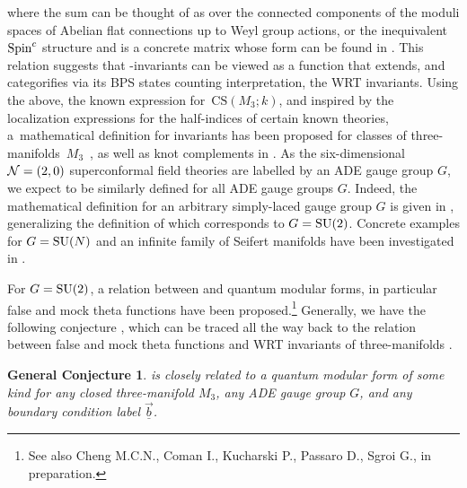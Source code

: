\documentclass[pdftex]{sigma}
\newcommand{\Zhshort}[3]{\ensuremath{\widehat{Z}^{#1}_{#2}\left(#3\right)}}
\def\bv{{\vec{\underline{b}}}}
\newtheorem*{conj*}{General Conjecture}
\theoremstyle{definition}
\numberwithin{equation}{section}
\begin{document}
where the sum can be thought of as over the connected components of the moduli spaces of Abelian flat connections up to Weyl group actions, or the inequivalent ${\rm Spin}^c$ structure and  is a concrete matrix whose form can be found in \cite{cheng20193d,gukov2019two,Gukov:2017kmk}. This relation suggests that -invariants can be viewed as a function that extends, and categorifies via its BPS states counting interpretation, the WRT invariants. Using the above, the known expression for~$\mathrm{CS}(M_3;k)$, and inspired by the localization expressions for the half-indices of certain known theories, a~mathematical definition for \smash{$\Zhshort{G}{\bv}{M_3}$} invariants has been proposed for classes of three-manifolds~$M_3$~\cite{Gukov:2017kmk}, as well as knot complements in \cite{gukov2019two}. As the six-dimensional ${\cal N}=(2,0)$ superconformal field theories are labelled by an ADE gauge group $G$, we expect \smash{$\widehat Z^G_\bv(M_3)$} to be similarly defined for all ADE gauge groups $G$. Indeed, the mathematical definition for an arbitrary simply-laced gauge group $G$ is given in \cite{Park:2019xey}, generalizing the definition of \cite{Gukov:2017kmk} which corresponds to $G={\rm SU}(2)$. Concrete examples for $G={\rm SU}(N)$ and an infinite family of Seifert manifolds have been investigated in \cite{Chung:2018rea}.

For $G={\rm SU}(2)$, a relation between \smash{$\Zhshort{{\rm SU}(2)}{\bv}{M_3}$} and quantum modular forms, in particular false \cite{Bringmann_2020,bringmann2019quantum,cheng20193d} and mock theta functions \cite{cheng20193d, Cheng:2019uzc, Park:2021ufu} %
have been proposed.\footnote{See also Cheng M.C.N., Coman I., Kucharski P., Passaro D., Sgroi G., in preparation.} Generally, we have the following conjecture \cite{cheng20193d}, which can be traced all the way back to the relation between false and mock theta functions and WRT invariants of three-manifolds \cite{2005RCD10509H, HIKAMI_2005, 2004mathph9016H,lawrence1999modular}.
\begin{conj*}
\smash{$\widehat Z^G_\bv(M_3)$} is closely related to a quantum modular form of some kind for any closed three-manifold $M_3$, any ADE gauge group $G$, and any boundary condition label $\bv$.
\end{conj*}
\end{document}
